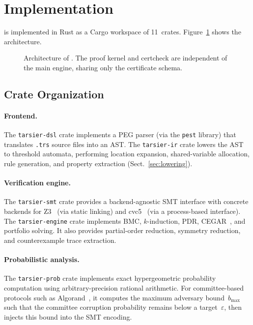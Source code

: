 \section{Implementation}\label{sec:implementation}

\tarsier{} is implemented in Rust as a Cargo workspace of 11~crates.
Figure~\ref{fig:arch} shows the architecture.

\begin{figure}[t]
\centering

\caption{Architecture of \tarsier{}.  The proof kernel and certcheck
are independent of the main engine, sharing only the certificate
schema.}
\label{fig:arch}
\end{figure}

\subsection{Crate Organization}

\paragraph{Frontend.}
The \texttt{tarsier-dsl} crate implements a PEG parser (via the
\texttt{pest} library) that translates \texttt{.trs} source files
into an AST\@.  The \texttt{tarsier-ir} crate lowers the AST to
threshold automata, performing location expansion, shared-variable
allocation, rule generation, and property extraction
(Sect.~\ref{sec:lowering}).

\paragraph{Verification engine.}
The \texttt{tarsier-smt} crate provides a backend-agnostic SMT
interface with concrete backends for Z3~\cite{DeMoura2008} (via static
linking) and cvc5~\cite{BarbosaBBKLMMMN2022} (via a process-based
interface).  The \texttt{tarsier-engine} crate implements BMC,
$k$-induction, PDR, CEGAR~\cite{ClarkeGJLV2000}, and portfolio
solving.  It also provides partial-order reduction, symmetry reduction,
and counterexample trace extraction.

\paragraph{Probabilistic analysis.}
The \texttt{tarsier-prob} crate implements exact hypergeometric
probability computation using arbitrary-precision rational arithmetic.
For committee-based protocols such as
Algorand~\cite{GiladHMVZ2017, Micali2017}, it computes the maximum
adversary bound~$b_{\max}$ such that the committee corruption
probability remains below a target~$\varepsilon$, then injects this
bound into the SMT encoding.

